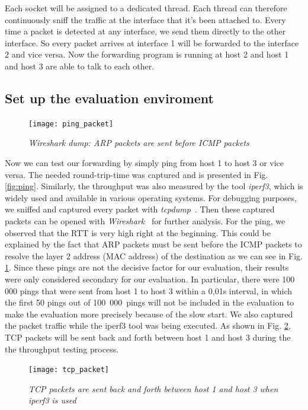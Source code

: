 Each socket will be assigned to a dedicated thread. Each thread can therefore continuously sniff the traffic at the interface that it's been attached to. Every time a packet is detected at any interface, we send them directly to the other interface. So every packet arrives at interface 1 will be forwarded to the interface 2 and vice versa. Now the forwarding program is running at host 2 and host 1 and host 3 are able to talk to each other.
\subsection{Set up the evaluation enviroment}
\begin{figure}[htbp]
\centering
\texttt{[image: ping\_packet]}
\caption{\em Wireshark dump: ARP packets are sent before ICMP packets}
\label{fig:arp_packets}
\end{figure}
Now we can test our forwarding by simply ping from host 1 to host 3 or vice versa. The needed round-trip-time was captured and is presented in Fig. \ref{fig:ping}. Similarly, the throughput was also measured by the tool \textit{iperf3}, which is widely used and available in various operating systems. For debugging purposes, we sniffed and captured every packet with \textit{tcpdump}~\cite{goyal2017comparative}. Then these captured packets can be opened with \textit{Wireshark}~\cite{orebaugh2006wireshark} for further analysis. For the ping, we observed that the RTT is very high right at the beginning. This could be explained by the fact that ARP packets must be sent before the ICMP packets to resolve the layer 2 address (MAC address) of the destination as we can see in Fig. \ref{fig:arp_packets}. 
Since these pings are not the decisive factor for our evaluation, their results were only considered secondary for our evaluation. In particular, there were 100 000 pings that were sent from host 1 to host 3 within a 0,01s interval, in which the first 50 pings out of \mbox{100 000 pings} will not be included in the evaluation to make the evaluation more precisely because of the slow start. We also captured the packet traffic while the iperf3 tool was being executed. As shown in Fig. \ref{fig:tcp_wireshark}, TCP packets will be sent back and forth between host 1 and host 3 during the the throughput testing process.
\begin{figure}[htbp]
\centering
\texttt{[image: tcp\_packet]}
\caption{\em TCP packets are sent back and forth between host 1 and host 3 when iperf3 is used}
\label{fig:tcp_wireshark}
\end{figure}
